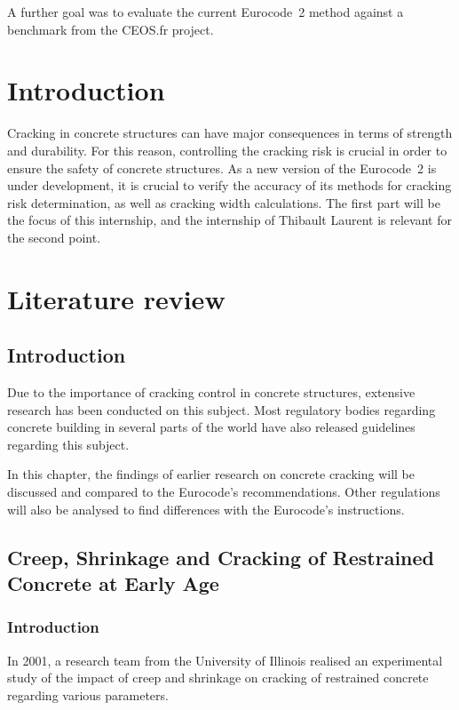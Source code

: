 \documentclass[a4paper,11pt]{memoir}
\begin{document}
A further goal was to evaluate the current Eurocode~2 method against a
benchmark from the CEOS.fr project.

\mainmatter
\chapter{Introduction}
Cracking in concrete structures can have major consequences in terms of
strength and durability. For this reason, controlling the cracking risk is
crucial in order to ensure the safety of concrete structures. As a new version
of the Eurocode~2 \cite{EC2} is under development, it is crucial to verify the accuracy
of its methods for cracking risk determination, as well as cracking width
calculations. The first part will be the focus of this internship, and the
internship of Thibault Laurent is relevant for the second point.

\chapter{Literature review}

\section{Introduction}
Due to the importance of cracking control in concrete structures, extensive
research has been conducted on this subject. Most regulatory bodies regarding
concrete building in several parts of the world have also released guidelines
regarding this subject.

In this chapter, the findings of earlier research on concrete cracking will be
discussed and compared to the Eurocode's recommendations. Other regulations
will also be analysed to find differences with the Eurocode's instructions.

\section[Creep, Shrinkage and Cracking of Restrained Concrete at Early Age]
{Creep, Shrinkage and Cracking of Restrained Concrete at Early Age
\cite{cscea}}
\subsection{Introduction}
In 2001, a research team from the University of Illinois realised an
experimental study of the impact of creep and shrinkage on cracking of
restrained concrete regarding various parameters.
\end{document}
